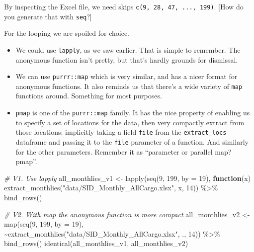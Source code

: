 \documentclass[
]{book}
\newenvironment{Shaded}{\begin{snugshade}}{\end{snugshade}}
\newcommand{\AttributeTok}[1]{\textcolor[rgb]{0.77,0.63,0.00}{#1}}
\newcommand{\CommentTok}[1]{\textcolor[rgb]{0.56,0.35,0.01}{\textit{#1}}}
\newcommand{\ControlFlowTok}[1]{\textcolor[rgb]{0.13,0.29,0.53}{\textbf{#1}}}
\newcommand{\DecValTok}[1]{\textcolor[rgb]{0.00,0.00,0.81}{#1}}
\newcommand{\FunctionTok}[1]{\textcolor[rgb]{0.00,0.00,0.00}{#1}}
\newcommand{\NormalTok}[1]{#1}
\newcommand{\OtherTok}[1]{\textcolor[rgb]{0.56,0.35,0.01}{#1}}
\newcommand{\SpecialCharTok}[1]{\textcolor[rgb]{0.00,0.00,0.00}{#1}}
\newcommand{\StringTok}[1]{\textcolor[rgb]{0.31,0.60,0.02}{#1}}
\providecommand{\tightlist}{%
  \setlength{\itemsep}{0pt}\setlength{\parskip}{0pt}}
\begin{document}
By inspecting the Excel file, we need skips \texttt{c(9,\ 28,\ 47,\ ...,\ 199)}. {[}How do you generate that with \texttt{seq}?{]}

For the looping we are spoiled for choice.

\begin{itemize}
\tightlist
\item
  We could use \texttt{lapply}, as we saw earlier. That is simple to remember. The anonymous function isn't pretty, but that's hardly grounds for dismissal.
\item
  We can use \texttt{purrr::map} which is very similar, and has a nicer format for anonymous functions. It also reminds us that there's a wide variety of \texttt{map} functions around. Something for most purposes.
\item
  \texttt{pmap} is one of the \texttt{purrr::map} family. It has the nice property of enabling us to specify a set of locations for the data, then very compactly extract from those locations: implicitly taking a field \texttt{file} from the \texttt{extract\_locs} dataframe and passing it to the \texttt{file} parameter of a function. And similarly for the other parameters. Remember it as ``parameter or parallel map? pmap''.
\end{itemize}

\begin{Shaded}
\begin{Highlighting}[]
\CommentTok{\# V1. Use lapply}
\NormalTok{all\_monthlies\_v1 }\OtherTok{\textless{}{-}} \FunctionTok{lapply}\NormalTok{(}\FunctionTok{seq}\NormalTok{(}\DecValTok{9}\NormalTok{, }\DecValTok{199}\NormalTok{, }\AttributeTok{by =} \DecValTok{19}\NormalTok{),}
                     \ControlFlowTok{function}\NormalTok{(x) }\FunctionTok{extract\_monthlies}\NormalTok{(}\StringTok{"data/SID\_Monthly\_AllCargo.xlsx"}\NormalTok{,}
\NormalTok{                                                   x, }\DecValTok{14}\NormalTok{)) }\SpecialCharTok{\%\textgreater{}\%} 
  \FunctionTok{bind\_rows}\NormalTok{()}

\CommentTok{\# V2. With \textquotesingle{}map\textquotesingle{} the anonymous function is more compact}
\NormalTok{all\_monthlies\_v2 }\OtherTok{\textless{}{-}} \FunctionTok{map}\NormalTok{(}\FunctionTok{seq}\NormalTok{(}\DecValTok{9}\NormalTok{, }\DecValTok{199}\NormalTok{, }\AttributeTok{by =} \DecValTok{19}\NormalTok{),}
                     \SpecialCharTok{\textasciitilde{}}\FunctionTok{extract\_monthlies}\NormalTok{(}\StringTok{"data/SID\_Monthly\_AllCargo.xlsx"}\NormalTok{, ., }\DecValTok{14}\NormalTok{)) }\SpecialCharTok{\%\textgreater{}\%} 
  \FunctionTok{bind\_rows}\NormalTok{()}
\FunctionTok{identical}\NormalTok{(all\_monthlies\_v1, all\_monthlies\_v2)}
\end{Highlighting}
\end{Shaded}
\end{document}
